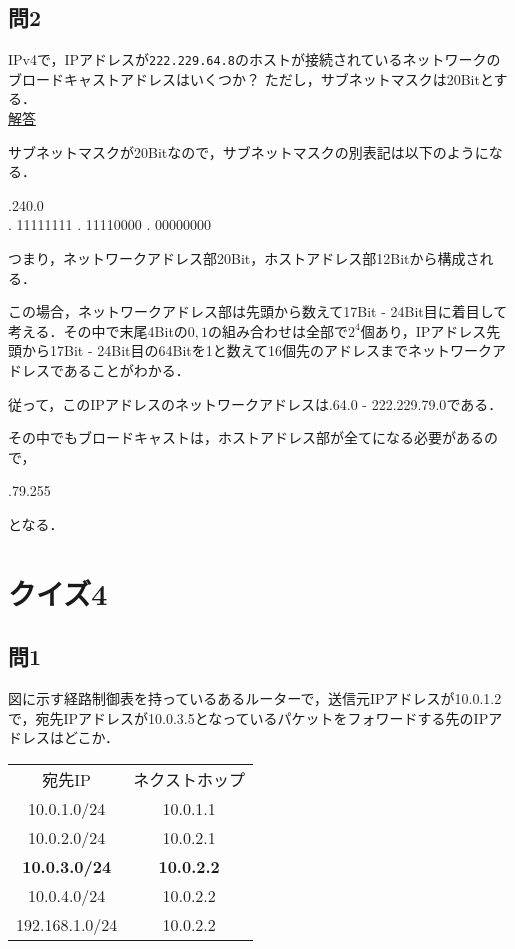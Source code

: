\documentclass[paper=a4,10pt,twocolumn]{jlreq}
\renewcommand{\indent}{\hspace{1\zw}}
\begin{document}
\subsection*{問2}
IPv4で，IPアドレスが\verb|222.229.64.8|のホストが接続されているネットワークのブロードキャストアドレスはいくつか？
ただし，サブネットマスクは20Bitとする．\\
\underline{解答}\par
サブネットマスクが20Bitなので，サブネットマスクの別表記は以下のようになる．
\begin{center}
    {.240.0}\\
    { . 11111111 . 11110000 . 00000000}
\end{center}
\indent つまり，ネットワークアドレス部20Bit，ホストアドレス部12Bitから構成される．\par
この場合，ネットワークアドレス部は先頭から数えて17Bit - 24Bit目に着目して考える．その中で末尾4Bitの\(0,1\)の組み合わせは全部で\(2^4\)個あり，IPアドレス先頭から17Bit - 24Bit目の64Bitを1と数えて16個先のアドレスまでネットワークアドレスであることがわかる．\par
従って，このIPアドレスのネットワークアドレスは{.64.0 - 222.229.79.0}である．\par
その中でもブロードキャストは，ホストアドレス部が全て{}になる必要があるので，
\begin{center}
    {.79.255}
\end{center}
となる．
\newpage
\section*{クイズ4}
\subsection*{問1}
図に示す経路制御表を持っているあるルーターで，送信元IPアドレスが10.0.1.2で，宛先IPアドレスが10.0.3.5となっているパケットをフォワードする先のIPアドレスはどこか．\\
\begin{tabular}[c]{cc}
    宛先IP                 & ネクストホップ           \\
    10.0.1.0/24          & 10.0.1.1          \\
    10.0.2.0/24          & 10.0.2.1          \\
    \textbf{10.0.3.0/24} & \textbf{10.0.2.2} \\
    10.0.4.0/24          & 10.0.2.2          \\
    192.168.1.0/24       & 10.0.2.2
\end{tabular}
\end{document}
